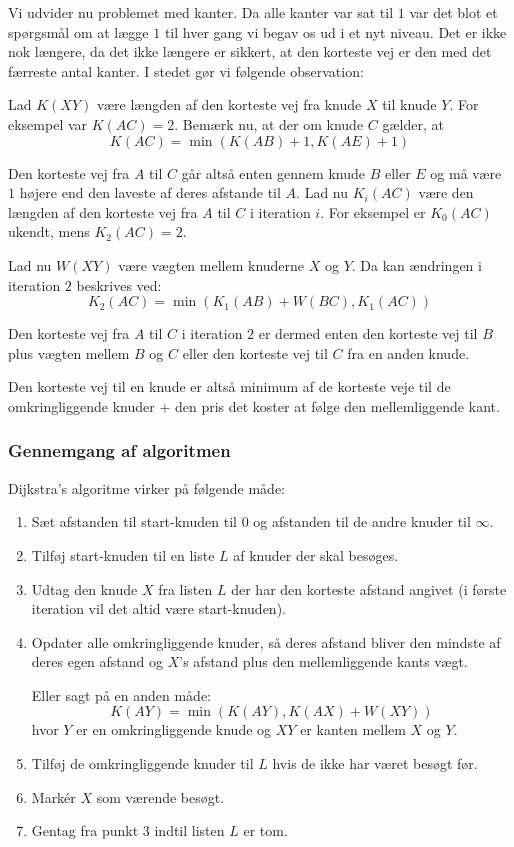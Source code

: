 \documentclass[10pt,a4paper,danish]{article}
\begin{document}
Vi udvider nu problemet med kanter. Da alle kanter var sat til $1$ var
det blot et spørgsmål om at lægge $1$ til hver gang vi begav os ud i
et nyt niveau. Det er ikke nok længere, da det ikke længere er
sikkert, at den korteste vej er den med det færreste antal kanter. I
stedet gør vi følgende observation:

Lad $K(XY)$ være længden af den korteste vej fra knude $X$ til knude
$Y$. For eksempel var $K(AC)=2$. Bemærk nu, at der om knude $C$
gælder, at
\[K(AC) = \min(K(AB)+1,K(AE)+1) \]

Den korteste vej fra $A$ til $C$ går altså enten gennem knude $B$
eller $E$ og må være $1$ højere end den laveste af deres afstande til
$A$.
Lad nu $K_i(AC)$ være den længden af den korteste vej fra $A$ til $C$
i iteration $i$. For eksempel er $K_0(AC)$ ukendt, mens $K_2(AC)=2$.

Lad nu $W(XY)$ være vægten mellem knuderne $X$ og $Y$. Da kan
ændringen i iteration $2$ beskrives ved:
\[ K_2(AC) = \min(K_1(AB) + W(BC), K_1(AC)) \]

Den korteste vej fra $A$ til $C$ i iteration $2$ er dermed enten den
korteste vej til $B$ plus vægten mellem $B$ og $C$ eller den korteste
vej til $C$ fra en anden knude.

Den korteste vej til en knude er altså minimum af de korteste veje til
de omkringliggende knuder + den pris det koster at følge den
mellemliggende kant.

\subsubsection{Gennemgang af algoritmen}
Dijkstra's algoritme virker på følgende måde:
\begin{enumerate}
\item Sæt afstanden til start-knuden til $0$ og afstanden til de andre
  knuder til $\infty$.
\item Tilføj start-knuden til en liste $L$ af knuder der skal besøges.
\item Udtag den knude $X$ fra listen $L$ der har den korteste afstand
  angivet (i første iteration vil det altid være start-knuden).
\item Opdater alle omkringliggende knuder, så deres afstand bliver den
  mindste af deres egen afstand og $X$'s afstand plus den
  mellemliggende kants vægt.

  Eller sagt på en anden måde:
  \[ K(AY) = \min(K(AY), K(AX)+W(XY)) \]
  hvor $Y$ er en omkringliggende knude og $XY$ er kanten mellem $X$ og
  $Y$.
\item Tilføj de omkringliggende knuder til $L$ hvis de ikke har været
  besøgt før.
\item Mark\'er $X$ som værende besøgt.
\item Gentag fra punkt 3 indtil listen $L$ er tom.
\end{enumerate}
\end{document}
